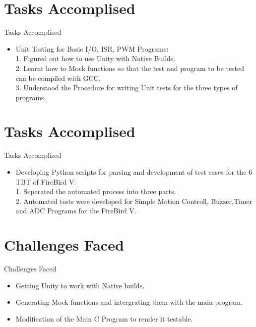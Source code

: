 \documentclass[10pt, a4paper]{beamer}
\begin{document}
\section{Tasks Accomplised}
\begin{frame}{Tasks Accomplised}
	\begin{itemize}
	  \item Unit Testing for Basic I/O, ISR, PWM Programs:\\ 
	  \hspace{.1cm} 1. Figured out how to use Unity with Native Builds. \\
          \hspace{.1cm} 2. Learnt how to  Mock functions so that the test and program to be tested can be compiled with GCC.\\
	  \hspace{.1cm} 3. Understood the Procedure for writing Unit tests for the three types of programs. \\
	\end{itemize}
\end{frame}

\section{Tasks Accomplised}
\begin{frame}{Tasks Accomplised}
	\begin{itemize}
	  \item Developing Python scripts for parsing and development of test cases for the 6 TBT of FireBird V:\\
	  \hspace{.1cm} 1. Seperated the automated process into three parts.\\
	  \hspace{.1cm} 2. Automated tests were developed for Simple Motion Controll, Buzzer,Timer and ADC Programs for the FireBird V. \\
	\end{itemize}
\end{frame}

\section{Challenges Faced}
\begin{frame}{Challenges Faced}
	\begin{itemize}
		\item Getting Unity to work with Native builds.\\
		\item Generating Mock functions and intergrating them with the main program.\\
		\item Modification of the Main C Program to render it testable.\\
	\end{itemize}
\end{frame}
\end{document}
